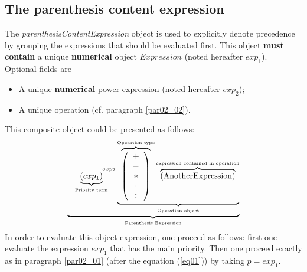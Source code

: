 \documentclass[11pt]{amsart}
\begin{document}
\subsection{The parenthesis content expression}\label{par02_04}
The {\it parenthesisContentExpression} object is used to explicitly denote precedence by grouping the expressions that should be evaluated first. This object {\bf must contain} a unique {\bf numerical} object $Expression$ (noted hereafter $exp_1$).\\
Optional fields are 
\begin{itemize}
\item A unique {\bf numerical} power expression (noted hereafter $exp_2$);
\item A unique operation (cf. paragraph \ref{par02_02}).\\
\end{itemize}
This composite object could be presented as follows:
\begin{equation}
 \underbrace{    \underbrace{ \left( exp_1\right) }_{\mbox{\tiny Priority term}} ^{\hspace{15mm}exp_2} \underbrace{  \overbrace{\left( \begin{array}{c} + \\ - \\ \ast  \\ \cdot \\ \div   \end{array} \right) }^{\mbox{\tiny Operation type}}
 \overbrace{    \left( \mbox{AnotherExpression}\right) }^{\mbox{\tiny expression contained in operation}}   }_{\mbox{\tiny Operation object}}}_{\mbox{\tiny Parenthesis Expression}}
\end{equation}
In order to evaluate this object expression, one proceed as follows: first one evaluate the expression $exp_1$ that has the main priority. Then one proceed exactly as in paragraph \ref{par02_01} (after the equation (\ref{eq01})) by taking $p=exp_1$.


\end{document}
